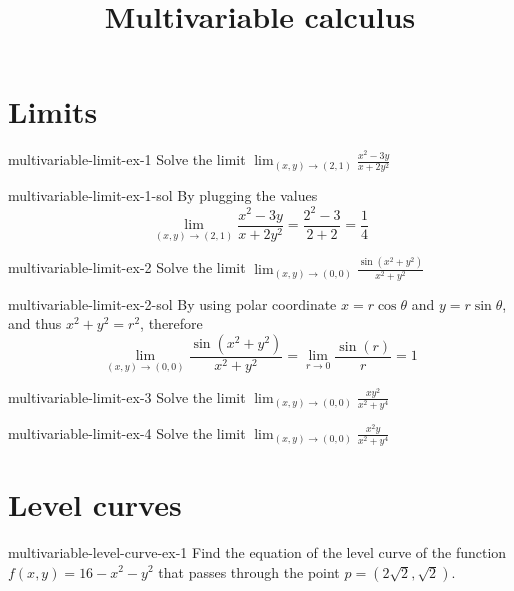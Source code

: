 \documentclass[preview]{standalone}
\begin{document}
\title{Multivariable calculus}
\genpage

\section{Limits}

\begin{snippetexercise}{multivariable-limit-ex-1}{}
Solve the limit \(\lim _{(x, y) \rightarrow(2,1)} \frac{x^2-3 y}{x+2 y^2}\)
\end{snippetexercise}

\begin{snippetsolution}{multivariable-limit-ex-1-sol}{}
By plugging the values \[
    \lim _{(x, y) \rightarrow(2,1)} \frac{x^2-3 y}{x+2 y^2}
    = \frac{2^2-3}{2+2} = \frac{1}{4}
\]
\end{snippetsolution}

\begin{snippetexercise}{multivariable-limit-ex-2}{}
Solve the limit \(\lim _{(x, y) \rightarrow(0,0)} \frac{\sin \left(x^2+y^2\right)}{x^2+y^2}\)
\end{snippetexercise}

\begin{snippetsolution}{multivariable-limit-ex-2-sol}{}
By using polar coordinate \(x=r\cos\theta\) and \(y=r\sin\theta\),
and thus \(x^2+y^2=r^2\), therefore
\[
    \lim_{(x, y) \rightarrow(0,0)} \frac{\sin \left(x^2+y^2\right)}{x^2+y^2}
    = \lim_{r \rightarrow 0} \frac{\sin \left(r\right)}{r}=1
\]
\end{snippetsolution}

\begin{snippetexercise}{multivariable-limit-ex-3}{}
Solve the limit \(\lim _{(x, y) \rightarrow(0,0)} \frac{x y^2}{x^2+y^4}\)
\end{snippetexercise}

\begin{snippetexercise}{multivariable-limit-ex-4}{}
Solve the limit \(\lim _{(x, y) \rightarrow(0,0)} \frac{x^2 y}{x^2+y^4}\)
\end{snippetexercise}

\section{Level curves}

\begin{snippetexercise}{multivariable-level-curve-ex-1}{}
    Find the equation of the level curve of the function \(f(x,y) = 16-x^2-y^2\)
    that passes through the point \(p=(2\sqrt{2}, \sqrt{2})\).
\end{snippetexercise}
\end{document}
